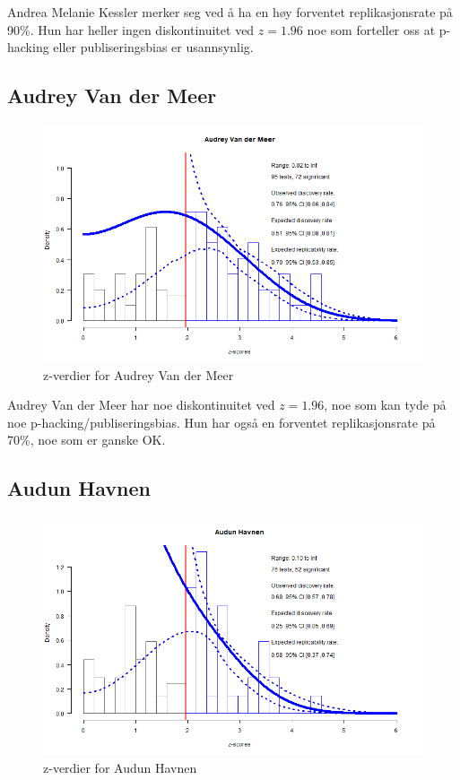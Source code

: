 \documentclass[doc,norsk]{apa7}
\begin{document}
Andrea Melanie Kessler merker seg ved å ha en høy forventet replikasjonsrate på 90\%. Hun har heller ingen diskontinuitet ved $z=1.96$ noe som forteller oss at p-hacking eller publiseringsbias er usannsynlig.

\subsection{Audrey Van der Meer}
\begin{figure}[h!]
    \centering
    \includegraphics[width=\textwidth]{images/Audrey Van der Meer.png}
    \caption{z-verdier for Audrey Van der Meer}
\end{figure}

Audrey Van der Meer har noe diskontinuitet ved $z=1.96$, noe som kan tyde på noe p-hacking/publiseringsbias. Hun har også en forventet replikasjonsrate på 70\%, noe som er ganske OK.


\subsection{Audun Havnen}
\begin{figure}[h!]
    \centering
    \includegraphics[width=\textwidth]{images/Audun Havnen.png}
    \caption{z-verdier for Audun Havnen}
\end{figure}
\end{document}

